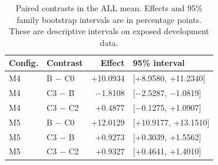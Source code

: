 \begin{table}[htbp]
\centering
\small
\caption{Paired contrasts in the ALL mean. Effects and 95\% family bootstrap intervals are in
percentage points. These are descriptive intervals on exposed development data.}
\label{tab:contrasts}
\setlength{\tabcolsep}{5pt}
\begin{tabular}{@{}llrl@{}}
\toprule
Config. & Contrast & Effect & 95\% interval \\
\midrule
M4 & B \ensuremath{-} C0 & +10.0934 & [+8.9580, +11.2340] \\
M4 & C3 \ensuremath{-} B & \ensuremath{-}1.8108 & [\ensuremath{-}2.5287, \ensuremath{-}1.0819] \\
M4 & C3 \ensuremath{-} C2 & +0.4877 & [\ensuremath{-}0.1275, +1.0907] \\
\addlinespace
M5 & B \ensuremath{-} C0 & +12.0129 & [+10.9177, +13.1510] \\
M5 & C3 \ensuremath{-} B & +0.9273 & [+0.3039, +1.5562] \\
M5 & C3 \ensuremath{-} C2 & +0.9327 & [+0.4641, +1.4010] \\
\bottomrule
\end{tabular}
\end{table}
